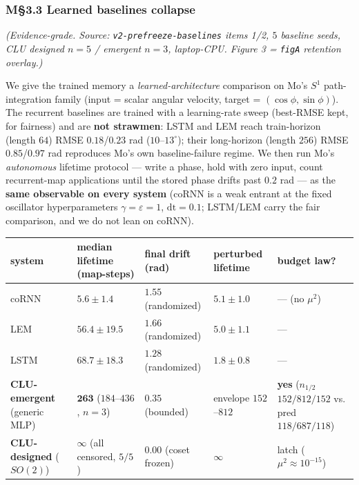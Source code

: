 \documentclass[10pt]{article}
\begin{document}
\subsubsection*{M\S3.3 Learned baselines collapse}

\emph{(Evidence-grade. Source: \texttt{v2-prefreeze-baselines} items 1/2, $5$ baseline seeds, CLU designed $n=5$ / emergent $n=3$, laptop-CPU. Figure 3 = \texttt{figA} retention overlay.)}

We give the trained memory a \emph{learned-architecture} comparison on Mo's $S^1$ path-integration family (input = scalar angular velocity, target = $(\cos\phi,\sin\phi)$). The recurrent baselines are trained with a learning-rate sweep (best-RMSE kept, for fairness) and are \textbf{not strawmen}: LSTM and LEM reach train-horizon (length $64$) RMSE $0.18$/$0.23$ rad ($10$--$13^\circ$); their long-horizon (length $256$) RMSE $0.85$/$0.97$ rad reproduces Mo's own baseline-failure regime. We then run Mo's \emph{autonomous} lifetime protocol --- write a phase, hold with zero input, count recurrent-map applications until the stored phase drifts past $0.2$ rad --- as the \textbf{same observable on every system} (coRNN is a weak entrant at the fixed oscillator hyperparameters $\gamma=\varepsilon=1$, $\mathrm{dt}=0.1$; LSTM/LEM carry the fair comparison, and we do not lean on coRNN).

\begin{center}\small
\begin{tabular}{@{}p{1.5in} p{1.35in} p{1.05in} p{1.05in} p{0.9in}@{}}
\toprule
system & median lifetime (map-steps) & final drift (rad) & perturbed lifetime & budget law? \\
\midrule
coRNN & $5.6\pm1.4$ & $1.55$ (randomized) & $5.1\pm1.0$ & --- (no $\mu^2$) \\
LEM & $56.4\pm19.5$ & $1.66$ (randomized) & $5.0\pm1.1$ & --- \\
LSTM & $68.7\pm18.3$ & $1.28$ (randomized) & $\mathbf{1.8\pm0.8}$ & --- \\
\textbf{CLU-emergent} (generic MLP) & $\mathbf{263}$ ($184$--$436$, $n{=}3$) & $\mathbf{0.35}$ (bounded) & envelope $152$--$812$ & \textbf{yes} ($n_{1/2}$ $152/812/152$ vs. pred $118/687/118$) \\
\textbf{CLU-designed} ($SO(2)$) & $\boldsymbol{\infty}$ (all censored, $5/5$) & $\mathbf{0.00}$ (coset frozen) & $\infty$ & latch ($\mu^2\!\approx\!10^{-15}$) \\
\bottomrule
\end{tabular}
\end{center}
\end{document}

